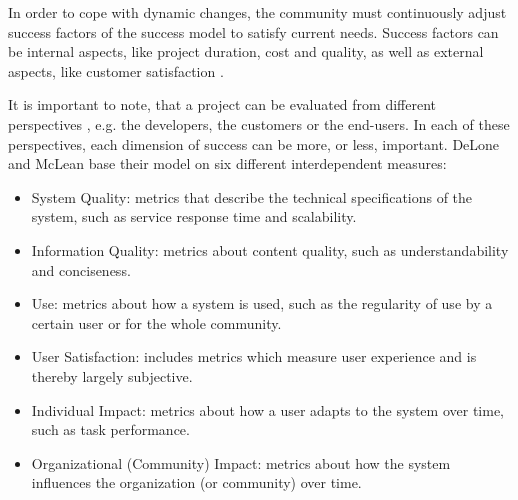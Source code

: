 In order to cope with dynamic changes, the community must continuously adjust success factors of the success model to satisfy current needs. Success factors can be internal aspects, like project duration, cost and quality, as well as external aspects, like customer satisfaction \cite{AgRa06}.

It is important to note, that a project can be evaluated from different perspectives \cite{RKJa15}, e.g. the developers, the customers or the end-users.
In each of these perspectives, each dimension of success can be more, or less, important.
DeLone and McLean \cite{DeMc92} base their model on six different interdependent measures:
\begin{itemize}
    \item System Quality: metrics that describe the technical specifications of the system, such as service response time and scalability.
    \item Information Quality: metrics about content quality, such as understandability and conciseness.
    \item Use: metrics about how a system is used, such as the regularity of use by a certain user or for the whole community.
    \item User Satisfaction: includes metrics which measure user experience and is thereby largely subjective.
    \item Individual Impact: metrics about how a user adapts to the system over time, such as task performance.
    \item Organizational (Community) Impact: metrics about how the system influences the organization (or community) over time.
\end{itemize}

